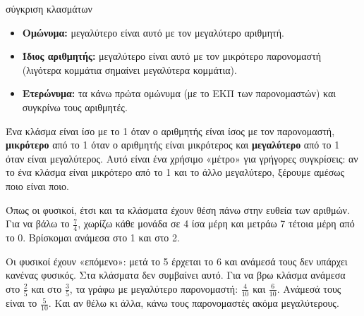 
\begin{kanonas}{σύγκριση κλασμάτων}
\begin{itemize}[leftmargin=1.2em,itemsep=0.3ex,topsep=2pt]
\item \textbf{Ομώνυμα:} μεγαλύτερο είναι αυτό με τον μεγαλύτερο αριθμητή.
\item \textbf{Ίδιος αριθμητής:} μεγαλύτερο είναι αυτό με τον μικρότερο παρονομαστή (λιγότερα κομμάτια σημαίνει μεγαλύτερα κομμάτια).
\item \textbf{Ετερώνυμα:} τα κάνω πρώτα ομώνυμα (με το ΕΚΠ των παρονομαστών) και συγκρίνω τους αριθμητές.
\end{itemize}
\end{kanonas}


Ένα κλάσμα είναι ίσο με το 1 όταν ο αριθμητής είναι ίσος με τον παρονομαστή, \textbf{μικρότερο} από το 1 όταν ο αριθμητής είναι μικρότερος και \textbf{μεγαλύτερο} από το 1 όταν είναι μεγαλύτερος. Αυτό είναι ένα χρήσιμο «μέτρο» για γρήγορες συγκρίσεις: αν το ένα κλάσμα είναι μικρότερο από το 1 και το άλλο μεγαλύτερο, ξέρουμε αμέσως ποιο είναι ποιο.


Όπως οι φυσικοί, έτσι και τα κλάσματα έχουν θέση πάνω στην ευθεία των αριθμών. Για να βάλω το $\frac{7}{4}$, χωρίζω κάθε μονάδα σε 4 ίσα μέρη και μετράω 7 τέτοια μέρη από το 0. Βρίσκομαι ανάμεσα στο 1 και στο 2.

\begin{center}
\end{center}


Οι φυσικοί έχουν «επόμενο»: μετά το 5 έρχεται το 6 και ανάμεσά τους δεν υπάρχει κανένας φυσικός. Στα κλάσματα δεν συμβαίνει αυτό. Για να βρω κλάσμα ανάμεσα στο $\frac{2}{5}$ και στο $\frac{3}{5}$, τα γράφω με μεγαλύτερο παρονομαστή: $\frac{4}{10}$ και $\frac{6}{10}$. Ανάμεσά τους είναι το $\frac{5}{10}$. Και αν θέλω κι άλλα, κάνω τους παρονομαστές ακόμα μεγαλύτερους.

